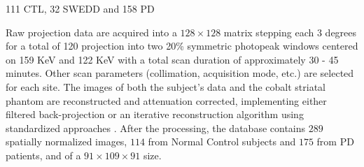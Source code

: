 111 CTL, 32 SWEDD and 158 PD

Raw projection data are acquired into a $128 \times 128$ matrix stepping each 3 degrees for a total of 120 projection into two 20\% symmetric photopeak windows centered on 159 KeV and 122 KeV with a total scan duration of approximately 30 - 45 minutes. Other scan parameters (collimation, acquisition mode, etc.) are selected for each site. The images of both the subject's data and the cobalt striatal phantom are reconstructed and attenuation corrected, implementing either filtered back-projection or an iterative reconstruction algorithm using standardized approaches \cite{Inititative2010}. After the processing, the database contains $289$ spatially normalized images, $114$ from Normal Control subjects and $175$ from PD patients, and of a $91\times109\times91$ size. 